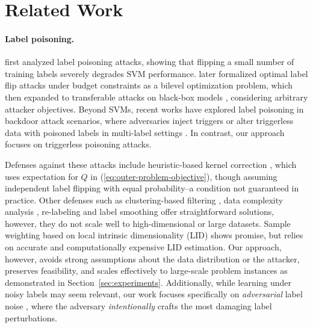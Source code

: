 \section{Related Work}
\label{sec:related-work}

\paragraph{Label poisoning.} 
\citet{biggio2012poisoning} first analyzed label poisoning attacks, showing that flipping a small number of training labels severely degrades SVM performance. 
\citet{adversarial-flip-svm} later formalized optimal label flip attacks under budget constraints as a bilevel optimization problem, which then expanded to transferable attacks on black-box models \citep{label-contamination-linear}, considering arbitrary attacker objectives.
Beyond SVMs, recent works have explored label poisoning in backdoor attack scenarios, where adversaries inject triggers or alter triggerless data with poisoned labels in multi-label settings \citep{label-poisoning, chen2022clean}.
In contrast, our approach focuses on triggerless poisoning attacks.

Defenses against these attacks include heuristic-based kernel correction \citep{svm-adversarial-noise}, which uses expectation for $Q$ in (\ref{eq:outer-problem-objective}),
though assuming independent label flipping with equal probability--a condition not guaranteed in practice.
Other defenses such as clustering-based filtering \citep{curie,tavallali2022adversarial}, data complexity analysis \citep{chan2018data}, re-labeling \citep{label-sanitization} and label smoothing \citep{rosenfeld2020certified} offer straightforward solutions, however, they do not scale well to high-dimensional or large datasets.
Sample weighting based on local intrinsic dimensionality (LID) \citep{defending-svms, ma2018characterizing} shows promise, but relies on accurate and computationally expensive LID estimation.
Our approach, however, avoids strong assumptions about the data distribution or the attacker, preserves feasibility, and scales effectively to large-scale problem instances as demonstrated in Section~\ref{sec:experiments}. 
Additionally, while learning under noisy labels \citep{frenay2013classification, learning-w-noisy-labels,hallaji2023label, zhang2024effective} may seem relevant,
our work focuses specifically on \textit{adversarial} label noise \citep{svm-adversarial-noise}, where the adversary \textit{intentionally} crafts the most damaging label perturbations. 
\vspace{-0.2cm}
